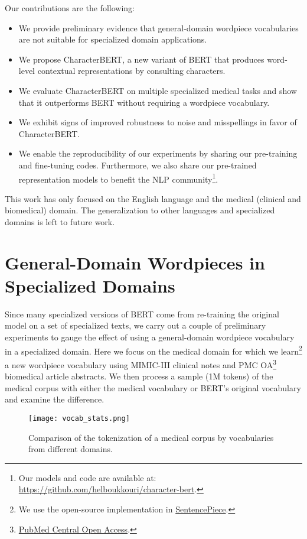 \documentclass[11pt]{article}
\begin{document}
Our contributions are the following:
\begin{itemize}
    \item We provide preliminary evidence that general-domain wordpiece vocabularies are not suitable for specialized domain applications.
    \item We propose CharacterBERT, a new variant of BERT that produces word-level contextual representations by consulting characters. \item We evaluate CharacterBERT on multiple specialized medical tasks and show that it outperforms BERT without requiring a wordpiece vocabulary.
    \item We exhibit signs of improved robustness to noise and misspellings in favor of CharacterBERT.
    \item We enable the reproducibility of our experiments by sharing our pre-training and fine-tuning codes. Furthermore, we also share our pre-trained representation models to benefit the NLP community\footnote{Our models and code are available at: \url{https://github.com/helboukkouri/character-bert}.}.
\end{itemize}

This work has only focused on the English language and the medical (clinical and biomedical) domain. The generalization to other languages and specialized domains is left to future work.

\section{General-Domain Wordpieces in Specialized Domains}

Since many specialized versions of BERT come from re-training the original model on a set of specialized texts, we carry out a couple of preliminary experiments to gauge the effect of using a general-domain wordpiece vocabulary in a specialized domain. Here we focus on the medical domain for which we learn\footnote{We use the open-source implementation in \href{https://github.com/google/sentencepiece}{SentencePiece}.} a new wordpiece vocabulary using MIMIC-III clinical notes \cite{johnson2016mimic} and PMC OA\footnote{\href{https://www.ncbi.nlm.nih.gov/pmc/tools/openftlist/}{PubMed Central Open Access}.} biomedical article abstracts. We then process a sample (1M tokens) of the medical corpus with either the medical vocabulary or BERT's original vocabulary and examine the difference.

\begin{figure}[htbp]
\begin{center} 
\texttt{[image: vocab\_stats.png]}
\end{center} 
\caption{Comparison of the tokenization of a medical corpus by vocabularies from different domains.} \label{vocabCompare1}
\end{figure}
\end{document}
